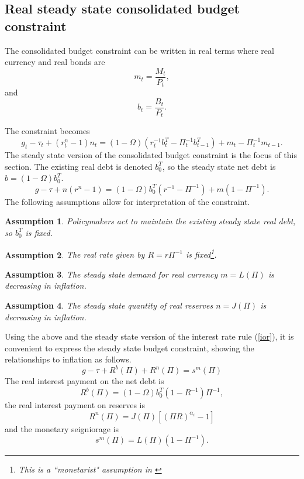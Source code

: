 \documentclass[]{article}
\newtheorem{assumption}{Assumption}
\begin{document}
\subsection{Real steady state consolidated budget constraint}

The consolidated budget constraint can be written in real terms where real currency and real bonds are
\[m_{t}=\frac{M_{t}}{P_{t}},\] and \[b_{t}=\frac{B_{t}}{P_{t}}.\]

The constraint becomes
\begin{equation}
g_{t}-\tau _{t}+(r_{t}^{n}-1)n_{t}=(1-\Omega)(r_{t}^{-1}b_{t}^{T}-\Pi^{-1}_{t}b_{t-1}^{T})+m_{t}-\Pi^{-1}_{t}m_{t-1}.
\label{cons bc real}
\end{equation}
The steady state version of the consolidated budget constraint is the focus of this section. The existing real debt is denoted $b^{T}_{0}$, so the steady state net debt is $b=(1-\Omega)b_{0}^{T}$.
\begin{equation}
g-\tau+n(r^{n}-1)=(1-\Omega)b_{0}^{T}(r^{-1}-\Pi^{-1})+m(1-\Pi^{-1}).
\label{cons bc real ss}
\end{equation}
The following assumptions allow for interpretation of the constraint.
\begin{assumption}
Policymakers act to maintain the existing steady state real debt, so $b_{0}^{T}$ is fixed.
\end{assumption}
\begin{assumption}
The real rate given by $R=r\Pi^{-1}$ is fixed\footnote{This is a ``monetarist" assumption in \textcite{sargent1981unpleasant}}.
\end{assumption}
\begin{assumption}
The steady state demand for real currency $m=L(\Pi)$ is decreasing in inflation.
\end{assumption}
\begin{assumption}
The steady state quantity of real reserves $n=J(\Pi)$ is decreasing in inflation. 
\end{assumption}

Using the above and the steady state version of the interest rate rule (\ref{ior}), it is convenient to express the steady state budget constraint, showing the relationships to inflation as follows.
\begin{equation}
g-\tau+R^{b}(\Pi)+R^{n}(\Pi)=s^{m}(\Pi)
\label{cons bc real ss fig}
\end{equation}
The real interest payment on the net debt is
\[R^{b}(\Pi)=(1-\Omega)b_{0}^{T}(1-R^{-1})\Pi^{-1},\]
the real interest payment on reserves is
\[R^{n}(\Pi)=J(\Pi)\left[\left(\Pi R\right)^{\alpha_{i}}-1\right]\]
and the monetary seigniorage is
\[s^{m}(\Pi)=L(\Pi)(1-\Pi^{-1}).\]
\end{document}
